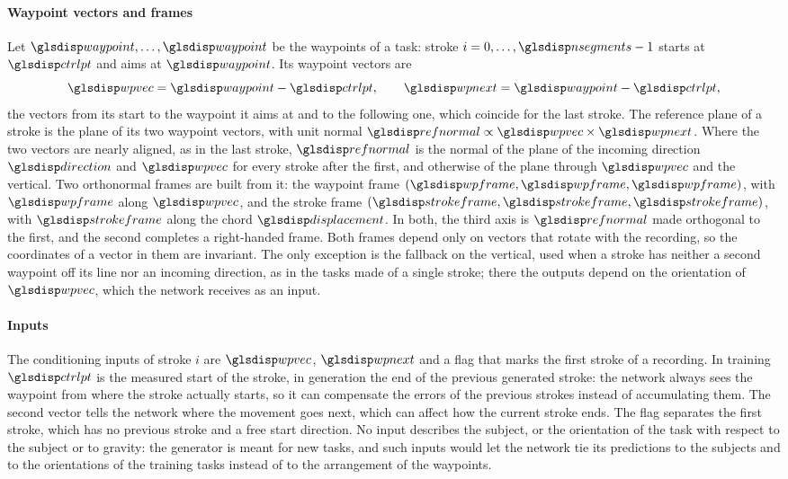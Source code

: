 \documentclass[12pt]{report}
\begin{document}
\paragraph{Waypoint vectors and frames}
Let $\sym{waypoint}_0,\dots,\sym{waypoint}_{\sym*{nsegments}}$ be the waypoints of a task: stroke $i=0,\dots,\sym{nsegments}-1$ starts at $\sym{ctrlpt}_{0,i}$ and aims at $\sym{waypoint}_{i+1}$. Its waypoint vectors are
\begin{equation}
    \sym{wpvec}_i=\sym{waypoint}_{i+1}-\sym{ctrlpt}_{0,i},\qquad \sym{wpnext}_i=\sym{waypoint}_{\min(i+2,\sym*{nsegments})}-\sym{ctrlpt}_{0,i},
    \label{eq:waypoint_vectors}
\end{equation}
the vectors from its start to the waypoint it aims at and to the following one, which coincide for the last stroke. The reference plane of a stroke is the plane of its two waypoint vectors, with unit normal $\sym{refnormal}_i\propto \sym{wpvec}_i\times \sym{wpnext}_i$. Where the two vectors are nearly aligned, as in the last stroke, $\sym{refnormal}_i$ is the normal of the plane of the incoming direction $\sym{direction}_i$ and $\sym{wpvec}_i$ for every stroke after the first, and otherwise of the plane through $\sym{wpvec}_i$ and the vertical. Two orthonormal frames are built from it: the waypoint frame $(\sym{wpframe}_1,\sym{wpframe}_2,\sym{wpframe}_3)$, with $\sym{wpframe}_1$ along $\sym{wpvec}_i$, and the stroke frame $(\sym{strokeframe}_1,\sym{strokeframe}_2,\sym{strokeframe}_3)$, with $\sym{strokeframe}_1$ along the chord $\sym{displacement}_i$. In both, the third axis is $\sym{refnormal}_i$ made orthogonal to the first, and the second completes a right-handed frame. Both frames depend only on vectors that rotate with the recording, so the coordinates of a vector in them are invariant. The only exception is the fallback on the vertical, used when a stroke has neither a second waypoint off its line nor an incoming direction, as in the tasks made of a single stroke; there the outputs depend on the orientation of $\sym{wpvec}_i$, which the network receives as an input.

\paragraph{Inputs}
The conditioning inputs of stroke $i$ are $\sym{wpvec}_i$, $\sym{wpnext}_i$ and a flag that marks the first stroke of a recording. In training $\sym{ctrlpt}_{0,i}$ is the measured start of the stroke, in generation the end of the previous generated stroke: the network always sees the waypoint from where the stroke actually starts, so it can compensate the errors of the previous strokes instead of accumulating them. The second vector tells the network where the movement goes next, which can affect how the current stroke ends. The flag separates the first stroke, which has no previous stroke and a free start direction. No input describes the subject, or the orientation of the task with respect to the subject or to gravity: the generator is meant for new tasks, and such inputs would let the network tie its predictions to the subjects and to the orientations of the training tasks instead of to the arrangement of the waypoints.
\end{document}
